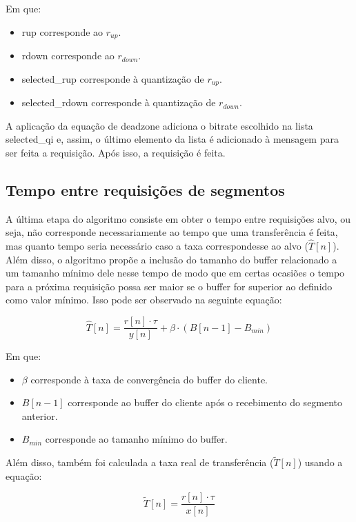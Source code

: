 \documentclass[10pt,twocolumn,letterpaper]{article}
\begin{document}
Em que:
\begin{itemize}
	\item rup corresponde ao $r_{up}$.
	\item rdown corresponde ao $r_{down}$.
	\item selected\_rup corresponde à quantização de $r_{up}$.
	\item selected\_rdown corresponde à quantização de $r_{down}$.
\end{itemize}

A aplicação da equação de deadzone adiciona o bitrate escolhido na lista selected\_qi e, assim, o último elemento da lista é adicionado à mensagem para ser feita a requisição. Após isso, a requisição é feita.

\subsection{Tempo entre requisições de segmentos}
A última etapa do algoritmo consiste em obter o tempo entre requisições alvo, ou seja, não corresponde necessariamente ao tempo que uma transferência é feita, mas quanto tempo seria necessário caso a taxa correspondesse ao alvo ($\hat{T}[n]$). Além disso, o algoritmo propõe a inclusão do tamanho do buffer relacionado a um tamanho mínimo dele nesse tempo de modo que em certas ocasiões o tempo para a próxima requisição possa ser maior se o buffer for superior ao definido como valor mínimo. Isso pode ser observado na seguinte equação:

\begin{equation}
	\hat{T}[n] = \frac{r[n] \cdot \tau}{y[n]} + \beta \cdot (B[n-1] - B_{min})
\end{equation}

Em que:
\begin{itemize}
	\item $\beta$ corresponde à taxa de convergência do buffer do cliente.
	\item $B[n-1]$ corresponde ao buffer do cliente após o recebimento do segmento anterior.
	\item $B_{min}$ corresponde ao tamanho mínimo do buffer.
\end{itemize}

Além disso, também foi calculada a taxa real de transferência ($\tilde{T}[n]$) usando a equação:

\begin{equation}
	\tilde{T}[n] = \frac{r[n] \cdot \tau}{x[n]}
\end{equation}
\end{document}
